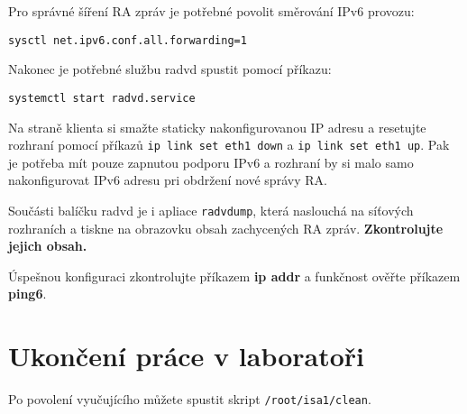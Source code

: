 \documentclass[a4paper,11pt,draft]{article}
\begin{document}
Pro správné šíření RA zpráv je potřebné povolit směrování IPv6 provozu:
\begin{verbatim}
sysctl net.ipv6.conf.all.forwarding=1
\end{verbatim}

Nakonec je potřebné službu radvd spustit pomocí příkazu:
\begin{verbatim}
systemctl start radvd.service
\end{verbatim}

Na straně klienta si smažte staticky nakonfigurovanou IP adresu a resetujte
rozhraní pomocí příkazů {\tt ip link set eth1 down} a {\tt ip link set eth1
up}. Pak je potřeba mít pouze zapnutou podporu IPv6 a rozhraní by si malo
samo nakonfigurovat IPv6 adresu pri obdržení nové správy RA.

Součásti balíčku radvd je i apliace {\tt radvdump}, která naslouchá na síťových
rozhraních a tiskne na obrazovku obsah zachycených RA zpráv. {\bf Zkontrolujte
jejich obsah.}

Úspešnou konfiguraci zkontrolujte příkazem {\bf ip addr} a funkčnost ověřte
příkazem {\bf ping6}.

\section{Ukončení práce v laboratoři}
Po povolení vyučujícího můžete spustit skript {\tt /root/isa1/clean}.
\end{document}
